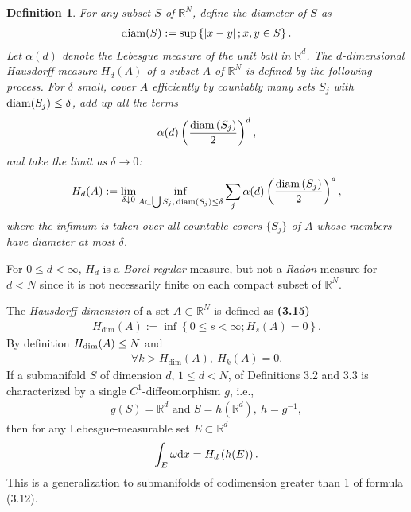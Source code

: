 \documentclass{book}
\numberwithin{equation}{section}
\newtheorem{definition}{Definition}[section]
\begin{document}
\begin{enumerate}
    \begin{definition}
        For any subset $S$ of $\mathbb{R}^N$, define the \emph{diameter} of $S$ as
        \begin{align*}
            {\rm diam}(S) := \sup\left\{\left|x - y\right|;x,y\in S\right\}.
        \end{align*}
        Let $\alpha(d)$ denote the Lebesgue measure of the unit ball in $\mathbb{R}^d$. The $d$-dimensional Hausdorff measure $H_d(A)$ of a subset $A$ of $\mathbb{R}^N$ is defined by the following process. For $\delta$ small, cover $A$ efficiently by countably many sets $S_j$ with ${\rm diam}(S_j)\le\delta$, add up all the terms
        \begin{align*}
            \alpha(d)\left(\frac{{\rm diam}\left(S_j\right)}{2}\right)^d,
        \end{align*}
        and take the limit as $\delta\to 0$:
        \begin{align*}
            H_d(A) := \lim_{\delta\downarrow 0} \inf_{A\subset\bigcup S_j,\,{\rm diam}\left(S_j\right)\le\delta} \sum_j \alpha(d)\left(\frac{{\rm diam}\left(S_j\right)}{2}\right)^d,
        \end{align*}
        where the infimum is taken over all countable covers $\{S_j\}$ of $A$ whose members have diameter at most $\delta$.
    \end{definition}
    For $0\le d < \infty$, $H_d$ is a \textit{Borel regular} measure, but not a \textit{Radon} measure for $d < N$ since it is not necessarily finite on each compact subset of $\mathbb{R}^N$.
    
    The \textit{Hausdorff dimension} of a set $A\subset\mathbb{R}^N$ is defined as \textbf{(3.15)}
    \begin{align*}
        H_{\dim}(A) := \inf\left\{0\le s < \infty;H_s(A) = 0\right\}.
    \end{align*}
    By definition $H_{\rm dim}(A)\le N$ and
    \begin{align*}
        \forall k > H_{\dim}(A),\ H_k(A) = 0.
    \end{align*}
    If a submanifold $S$ of dimension $d$, $1\le d < N$, of Definitions 3.2 and 3.3 is characterized by a single $C^1$-diffeomorphism $g$, i.e.,
    \begin{align*}
        g(S) = \mathbb{R}^d \mbox{ and }  S = h\left(\mathbb{R}^d\right),\ h = g^{-1},
    \end{align*}
    then for any Lebesgue-measurable set $E\subset\mathbb{R}^d$
    \begin{align*}
        \int_E \omega{\rm d}x = H_d\left(h(E)\right).
    \end{align*}
    This is a generalization to submanifolds of codimension greater than 1 of formula (3.12).
    

\end{enumerate}
\end{document}
